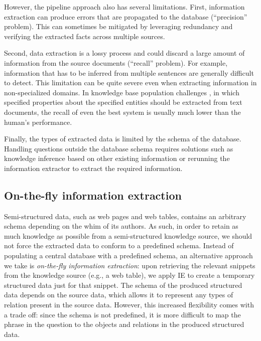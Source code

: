 However, the pipeline approach also has several limitations.
First, information extraction
can produce errors that are propagated to the database
(``precision'' problem).
This can sometimes be mitigated by leveraging redundancy
and verifying the extracted facts across multiple sources.

Second, data extraction is a lossy process
and could discard a large amount of information from the source documents
(``recall'' problem).
For example, information that has to be inferred from
multiple sentences are generally difficult to detect.
This limitation can be quite severe even when extracting
information in non-specialized domains.
In knowledge base population challenges \cite{ji2011knowledge,ellis2015tackbp},
in which specified properties about the specified entities
should be extracted from text documents,
the recall of even the best system is usually much lower
than the human's performance.

Finally,
the types of extracted data
is limited by the schema of the database.
Handling questions outside the database schema
requires solutions such as knowledge inference
based on other existing information \cite{nickel2011three,riedel13universal,neelakantan2015compositional}
or rerunning the information extractor to extract the required information.

\subsection{On-the-fly information extraction}

Semi-structured data, such as web pages and web tables,
contains an arbitrary schema depending on the whim of its authors.
As such, in order to retain as much knowledge as possible
from a semi-structured knowledge source,
we should not force the extracted data to conform to a predefined schema.
Instead of populating a central database with a predefined schema,
an alternative approach we take is
\emph{on-the-fly information extraction}:
upon retrieving the relevant snippets from the knowledge source
(e.g., a web table),
we apply IE to create a temporary structured data
just for that snippet.
The schema of the produced structured data depends on
the source data,
which allows it to represent any types of relation present
in the source data.
However, this increased flexibility comes with a trade off:
since the schema is not predefined,
it is more difficult to map the phrase in the question
to the objects and relations in the produced structured data.

